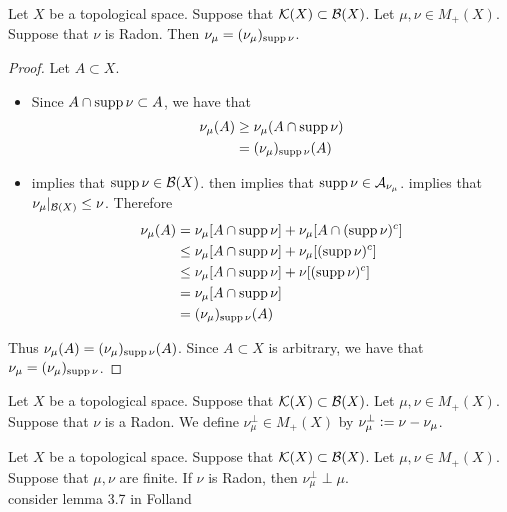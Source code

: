 \documentclass{book}
\begin{document}
	\begin{ex} 
		Let $X$ be a topological space. Suppose that $\mathcal{K}(X) \subset \mathcal{B}(X)$. Let $\mu, \nu \in M_+(X)$. Suppose that $\nu$ is Radon. Then $\nu_{\mu} = (\nu_{\mu})_{\operatorname{supp} \nu}$. 
	\end{ex}

	\begin{proof}
		Let $A \subset X$. 
		\begin{itemize}
			\item Since $A \cap \operatorname{supp} \nu \subset A$, we have that
			\begin{align*}
				\nu_{\mu}(A) 
				& \geq \nu_{\mu}(A \cap \operatorname{supp} \nu) \\
				& = (\nu_{\mu})_{\operatorname{supp} \nu}(A) 
			\end{align*}
			\item {} implies that $\operatorname{supp} \nu \in \mathcal{B}(X)$.  then implies that $\operatorname{supp} \nu \in \mathcal{A}_{\nu_{\mu}}$.  implies that $\nu_{\mu}|_{\mathcal{B}(X)} \leq \nu$. Therefore
			\begin{align*}
				\nu_{\mu}(A)
				& = \nu_{\mu}[A \cap \operatorname{supp} \nu] + \nu_{\mu}[A \cap (\operatorname{supp} \nu)^c] \\
				& \leq \nu_{\mu}[A \cap \operatorname{supp} \nu] + \nu_{\mu}[(\operatorname{supp} \nu)^c] \\ 
				& \leq \nu_{\mu}[A \cap \operatorname{supp} \nu] + \nu[(\operatorname{supp} \nu)^c] \\ 
				& = \nu_{\mu}[A \cap \operatorname{supp} \nu] \\
				& = (\nu_{\mu})_{\operatorname{supp} \nu}(A)
			\end{align*}
		\end{itemize}
		Thus $\nu_{\mu}(A) = (\nu_{\mu})_{\operatorname{supp} \nu}(A)$. Since $A \subset X$ is arbitrary, we have that $\nu_{\mu} = (\nu_{\mu})_{\operatorname{supp} \nu}$.
	\end{proof}
	
	\begin{defn} 
		Let $X$ be a topological space. Suppose that $\mathcal{K}(X) \subset \mathcal{B}(X)$. Let $\mu, \nu \in M_+(X)$. Suppose that $\nu$ is a Radon. We define $\nu_{\mu}^{\perp} \in M_+(X)$ by $\nu_{\mu}^{\perp} \vcentcolon= \nu - \nu_{\mu}$.
	\end{defn}
	
	\begin{ex} 
		Let $X$ be a topological space. Suppose that $\mathcal{K}(X) \subset \mathcal{B}(X)$. Let $\mu, \nu \in M_+(X)$. Suppose that $\mu,\nu$ are finite. If $\nu$ is Radon, then $\nu_{\mu}^{\perp} \perp \mu$. \\
		 consider lemma 3.7 in Folland
	\end{ex}
	
\end{document}

